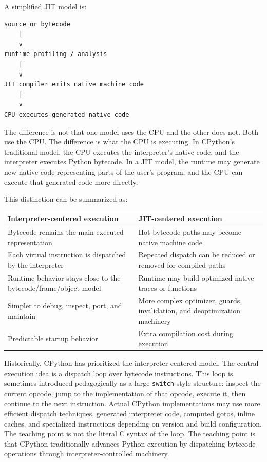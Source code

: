 A simplified JIT model is:

\begin{verbatim}
source or bytecode
    |
    v
runtime profiling / analysis
    |
    v
JIT compiler emits native machine code
    |
    v
CPU executes generated native code
\end{verbatim}

The difference is not that one model uses the CPU and the other does not. Both use the CPU. The difference is what the CPU is executing. In CPython's traditional model, the CPU executes the interpreter's native code, and the interpreter executes Python bytecode. In a JIT model, the runtime may generate new native code representing parts of the user's program, and the CPU can execute that generated code more directly.

This distinction can be summarized as:

\begin{center}
\begin{tabular}{|p{}|p{}|}
\hline
\textbf{Interpreter-centered execution} & \textbf{JIT-centered execution} \\
\hline
Bytecode remains the main executed representation & Hot bytecode paths may become native machine code \\
\hline
Each virtual instruction is dispatched by the interpreter & Repeated dispatch can be reduced or removed for compiled paths \\
\hline
Runtime behavior stays close to the bytecode/frame/object model & Runtime may build optimized native traces or functions \\
\hline
Simpler to debug, inspect, port, and maintain & More complex optimizer, guards, invalidation, and deoptimization machinery \\
\hline
Predictable startup behavior & Extra compilation cost during execution \\
\hline
\end{tabular}
\end{center}

Historically, CPython has prioritized the interpreter-centered model. The central execution idea is a dispatch loop over bytecode instructions. This loop is sometimes introduced pedagogically as a large \texttt{switch}-style structure: inspect the current opcode, jump to the implementation of that opcode, execute it, then continue to the next instruction. Actual CPython implementations may use more efficient dispatch techniques, generated interpreter code, computed gotos, inline caches, and specialized instructions depending on version and build configuration. The teaching point is not the literal C syntax of the loop. The teaching point is that CPython traditionally advances Python execution by dispatching bytecode operations through interpreter-controlled machinery.

